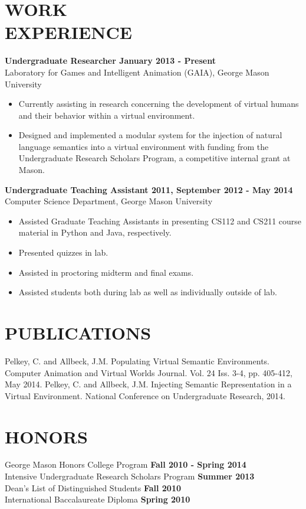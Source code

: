 \documentclass[line, margin]{res}
\begin{document}
\begin{resume}
\section{WORK \\ EXPERIENCE}
	\textbf{Undergraduate Researcher \hfill January 2013 - Present} \\
	Laboratory for Games and Intelligent Animation (GAIA), George Mason University
	\begin{itemize}  \itemsep -2pt %
		\item Currently assisting in research concerning the development of virtual humans and their behavior within a virtual environment.
		\item Designed and implemented a modular system for the injection of natural language semantics into a virtual environment with funding from the Undergraduate Research Scholars Program, a competitive internal grant at Mason.
	\end{itemize}
	\textbf{Undergraduate Teaching Assistant \hfill 2011, September 2012 - May 2014} \\
	Computer Science Department, George Mason University
	\begin{itemize}  \itemsep -2pt %
		\item Assisted Graduate Teaching Assistants in presenting CS112 and CS211 course material in Python and Java, respectively.
		\item Presented quizzes in lab.
		\item Assisted in proctoring midterm and final exams.
		\item Assisted students both during lab as well as individually outside of lab.
	\end{itemize}

\section{PUBLICATIONS}
	Pelkey, C. and Allbeck, J.M. Populating Virtual Semantic Environments. Computer Animation and Virtual Worlds Journal. Vol. 24 Iss. 3-4, pp. 405-412, May 2014.\vspace{5pt}
	Pelkey, C. and Allbeck, J.M. Injecting Semantic Representation in a Virtual Environment. National Conference on Undergraduate Research, 2014.

\section{HONORS}
	George Mason Honors College Program \hfill \textbf{Fall 2010 - Spring 2014}	\\
	Intensive Undergraduate Research Scholars Program \hfill \textbf{Summer 2013}	\\
	Dean's List of Distinguished Students \hfill \textbf{Fall 2010}	\\
	International Baccalaureate Diploma \hfill \textbf{Spring 2010}			\\


\end{resume}
\end{document}
